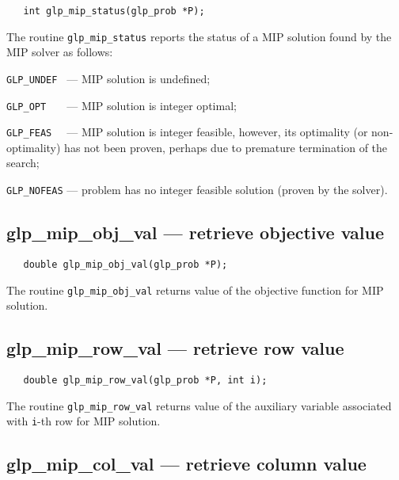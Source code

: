 \synopsis

\begin{verbatim}
   int glp_mip_status(glp_prob *P);
\end{verbatim}

\returns

The routine \verb|glp_mip_status| reports the status of a MIP solution
found by the MIP solver as follows:

\verb|GLP_UNDEF | --- MIP solution is undefined;

\verb|GLP_OPT   | --- MIP solution is integer optimal;

\verb|GLP_FEAS  | --- MIP solution is integer feasible, however, its
optimality (or non-optimality) has not been proven, perhaps due to
premature termination of the search;

\verb|GLP_NOFEAS| --- problem has no integer feasible solution (proven
by the solver).

\subsection{glp\_mip\_obj\_val --- retrieve objective value}

\synopsis

\begin{verbatim}
   double glp_mip_obj_val(glp_prob *P);
\end{verbatim}

\returns

The routine \verb|glp_mip_obj_val| returns value of the objective
function for MIP solution.

\newpage

\subsection{glp\_mip\_row\_val --- retrieve row value}

\synopsis

\begin{verbatim}
   double glp_mip_row_val(glp_prob *P, int i);
\end{verbatim}

\returns

The routine \verb|glp_mip_row_val| returns value of the auxiliary
variable associated with \verb|i|-th row for MIP solution.

\subsection{glp\_mip\_col\_val --- retrieve column value}

